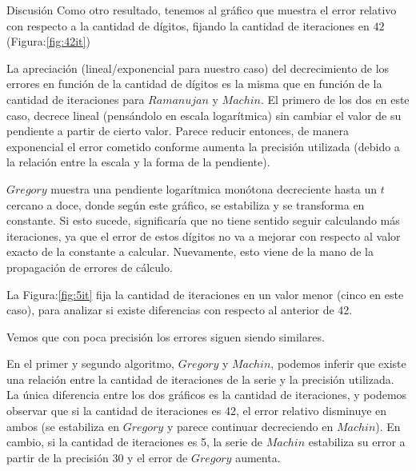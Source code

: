 \begin{section}{Discusión}
	Como otro resultado, tenemos al gráfico que muestra el error relativo con respecto a la cantidad de dígitos, fijando la cantidad de iteraciones en $42$ (Figura:\ref{fig:42it})
	
	La apreciación (lineal/exponencial para nuestro caso) del decrecimiento de los errores en función de la cantidad de dígitos es la misma que en función de la cantidad de iteraciones para $Ramanujan$ y $Machin$. El primero de los dos en este caso, decrece lineal (pensándolo en escala logarítmica) sin cambiar el valor de su pendiente a partir de cierto valor. Parece reducir entonces, de manera exponencial el error cometido conforme aumenta la precisión utilizada (debido a la relación entre la escala y la forma de la pendiente).
	
	$Gregory$ muestra una pendiente logarítmica monótona decreciente hasta un $t$ cercano a doce, donde según este gráfico, se estabiliza y se transforma en constante. Si esto sucede, significaría que no tiene sentido seguir calculando más iteraciones, ya que el error de estos dígitos no va a mejorar con respecto al valor exacto de la constante a calcular. Nuevamente, esto viene de la mano de la propagación de errores de cálculo.
	
	La Figura:\ref{fig:5it} fija la cantidad de iteraciones en un valor menor (cinco en este caso), para analizar si existe diferencias con respecto al anterior de 42.
	
	Vemos que con poca precisión los errores siguen siendo similares.
	
	
	En el primer y segundo algoritmo, $Gregory$ y $Machin$, podemos inferir que existe una relación entre la cantidad de iteraciones de la serie y la precisión utilizada. La única diferencia entre los dos gráficos es la cantidad de iteraciones, y podemos observar que si la cantidad de iteraciones es 42, el error relativo disminuye en ambos (se estabiliza en $Gregory$ y parece continuar decreciendo en $Machin$). En cambio, si la cantidad de iteraciones es 5, la serie de $Machin$ estabiliza su error a partir de la precisión 30 y el error de $Gregory$ aumenta. \\
	

\end{section}
